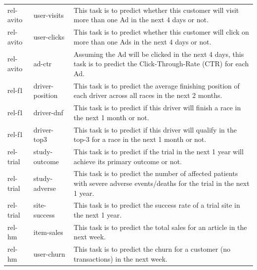 \documentclass[11pt]{article}
\begin{document}
\begin{longtable}{@{}p{2cm}p{2cm}p{11cm}@{}}
    rel-avito & user-visits & This task is to predict whether this customer will visit more than one Ad in the next 4 days or not. \\
    rel-avito & user-clicks & This task is to predict whether this customer will click on more than one Ads in the next 4 days or not. \\
    rel-avito & ad-ctr & Assuming the Ad will be clicked in the next 4 days, this task is to predict the Click-Through-Rate (CTR) for each Ad. \\
    rel-f1 & driver-position & This task is to predict the average finishing position of each driver across all races in the next 2 months. \\
    rel-f1 & driver-dnf & This task is to predict if this driver will finish a race in the next 1 month or not. \\
    rel-f1 & driver-top3 & This task is to predict if this driver will qualify in the top-3 for a race in the next 1 month or not. \\
    rel-trial & study-outcome & This task is to predict if the trial in the next 1 year will achieve its primary outcome or not. \\
    rel-trial & study-adverse & This task is to predict the number of affected patients with severe adverse events/deaths for the trial in the next 1 year. \\
    rel-trial & site-success & This task is to predict the success rate of a trial site in the next 1 year. \\
    rel-hm & item-sales & This task is to predict the total sales for an article in the next week. \\
    rel-hm & user-churn & This task is to predict the churn for a customer (no transactions) in the next week. \\
\end{longtable}
\end{document}
